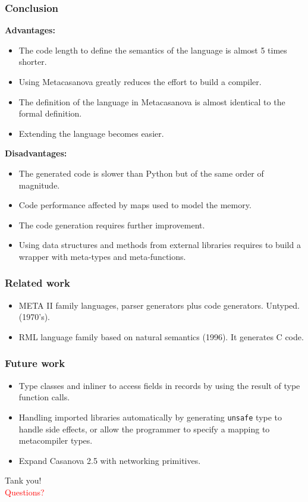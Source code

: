 \documentclass[mathserif,serif]{beamer}
\begin{document}
\begin{frame}
	\frametitle{Conclusion}
	\textbf{Advantages:}
	\begin{itemize}
		\item The code length to define the semantics of the language is almost 5 times shorter.
		\item Using Metacasanova greatly reduces the effort to build a compiler.
		\item The definition of the language in Metacasanova is almost identical to the formal definition.
		\item Extending the language becomes easier.
	\end{itemize}
	\textbf{Disadvantages:}
	\begin{itemize}
		\item The generated code is slower than Python but of the same order of magnitude.
		\item Code performance affected by maps used to model the memory.
		\item The code generation requires further improvement.
		\item Using data structures and methods from external libraries requires to build a wrapper with meta-types and meta-functions.
	\end{itemize}
\end{frame}

\begin{frame}
	\frametitle{Related work}
	
	\begin{itemize}
		\item META II family languages, parser generators plus code generators. Untyped. (1970's).
		\item RML language family based on natural semantics (1996). It generates C code.
	\end{itemize}
\end{frame}

\begin{frame}
	\frametitle{Future work}
	
	\begin{itemize}
		\item Type classes and inliner to access fields in records by using the result of type function calls.
		\item Handling imported libraries automatically by generating \texttt{unsafe} type to handle side effects, or allow the programmer to specify a mapping to metacompiler types.
		\item Expand Casanova 2.5 with networking primitives.
	\end{itemize}
\end{frame}

\begin{frame}
	\centering
	\Huge
	Tank you!\\
	\vspace{0.5cm}
	\textcolor{red}{Questions?}
\end{frame}
\end{document}
